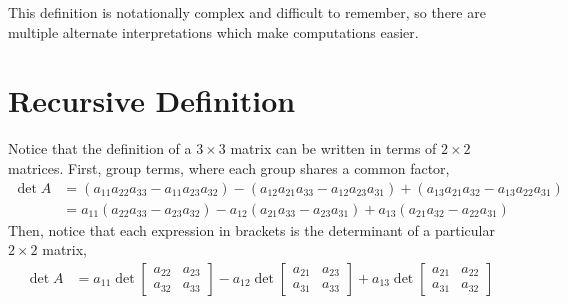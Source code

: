 \documentclass[letterpaper,12pt]{article}
\begin{document}
This definition is notationally complex and difficult to remember, so there are multiple alternate interpretations which make computations easier.

\section*{Recursive Definition}
Notice that the definition of a $3 \times 3$ matrix can be written in terms of $2 \times 2$ matrices. First, group terms, where each group shares a common factor,
\begin{align*}
     \det{A} & = (a_{11} a_{22} a_{33} - a_{11} a_{23} a_{32}) - (a_{12} a_{21} a_{33} - a_{12} a_{23} a_{31}) + (a_{13} a_{21} a_{32} - a_{13} a_{22} a_{31}) \\
     & = a_{11} (a_{22} a_{33} - a_{23} a_{32}) - a_{12}(a_{21} a_{33} - a_{23} a_{31}) + a_{13} (a_{21} a_{32} - a_{22} a_{31})
\end{align*}
Then, notice that each expression in brackets is the determinant of a particular $2 \times 2$ matrix,
\begin{align*}
    \det{A} & = a_{11} \det{\begin{bmatrix} a_{22} & a_{23} \\ a_{32} & a_{33} \end{bmatrix}} - a_{12} \det{\begin{bmatrix} a_{21} & a_{23} \\ a_{31} & a_{33} \end{bmatrix}} + a_{13} \det{\begin{bmatrix} a_{21} & a_{22} \\ a_{31} & a_{32} \end{bmatrix}}
\end{align*}
\end{document}
